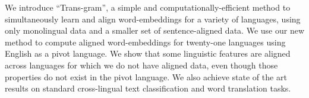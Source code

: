 We introduce ``Trans-gram'', a simple and computationally-efficient method to simultaneously learn and align word-embeddings for a variety of languages, using only monolingual data and a smaller set of sentence-aligned data. We use our new method to compute aligned word-embeddings for twenty-one languages using English as a pivot language. We show that some linguistic features are aligned across languages for which we do not have aligned data, even though those properties do not exist in the pivot language. We also achieve state of the art results on standard cross-lingual text classification and word translation tasks.
